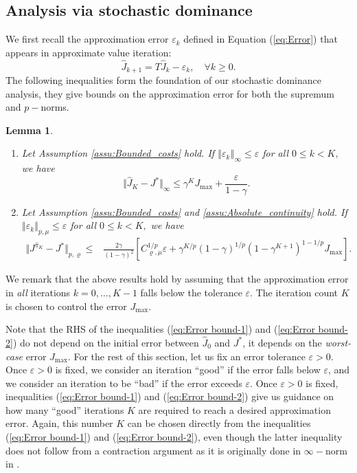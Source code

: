 \documentclass[12pt,technote,onecolumn]{IEEEtran}
\newtheorem{lemma}{Lemma}
\begin{document}
\subsection{Analysis via stochastic dominance}\label{sec6.3}

We first recall the approximation error $\varepsilon_{k}$ defined
in Equation (\ref{eq:Error}) that appears in approximate value iteration:
\[
\widehat{J}_{k+1}=T\widehat{J}_{k}-\varepsilon_{k},\quad\forall k\geq0.
\]
The following inequalities form the foundation of our stochastic dominance
analysis, they give bounds on the approximation error for both the
supremum and $p-$norms.
\begin{lemma}
	\label{lem:Stoc_approximation error} 
		\begin{enumerate}
			\item Let Assumption \ref{assu:Bounded_costs}
			hold. If $\left\Vert \varepsilon_{k}\right\Vert _{\infty}\leq\varepsilon$
			for all $0\leq k<K,$ we have
			\begin{equation}
			\Vert \widehat{J}_{K}-J^{*}\Vert _{\infty}\leq\gamma^{K}J_{\max}+\frac{\varepsilon}{1-\gamma}.\label{eq:Error bound-1}
			\end{equation}
			\item Let Assumption \ref{assu:Bounded_costs} and \ref{assu:Absolute_continuity}
			hold. If $\left\Vert \varepsilon_{k}\right\Vert _{p,\mu}\leq\varepsilon$
			for all $0\leq k<K,$ we have			
			\begin{equation}
			\begin{aligned}
			\Vert J^{\widehat{\pi}_{K}}-J^{*}\Vert _{p,\varrho}\leq&\frac{2\gamma}{\left(1-\gamma\right)^{2}}[C_{\varrho,\mu}^{1/p}\varepsilon
			+\gamma^{K/p}(1-\gamma)^{1/p}
			(1-\gamma^{K+1})^{1-1/p}J_{\max}].\label{eq:Error bound-2}
			\end{aligned}
			\end{equation}
		\end{enumerate}	
\end{lemma}

We remark that the above results hold by assuming that the approximation
error in\textbf{ }\emph{all}\textbf{ }iterations $k=0,\dots,K-1$
falls below the tolerance $\varepsilon.$ The iteration count $K$
is chosen to control the error $J_{\max}.$ 

Note that the RHS of the inequalities (\ref{eq:Error bound-1}) and
(\ref{eq:Error bound-2}) do not depend on the initial error between
$\widehat{J}_{0}$ and $J^{*}$, it depends on the \textit{worst-case}
error $J_{\max}$. For the rest of this section, let us fix an error
tolerance $\varepsilon>0$. Once $\varepsilon>0$ is fixed, we consider
an iteration ``good'' if the error falls below $\varepsilon$, and
we consider an iteration to be ``bad'' if the error exceeds $\varepsilon$.
Once $\varepsilon>0$ is fixed, inequalities (\ref{eq:Error bound-1})
and (\ref{eq:Error bound-2}) give us guidance on how many ``good''
iterations $K$ are required to reach a desired approximation error.
Again, this number $K$ can be chosen directly from the inequalities
(\ref{eq:Error bound-1}) and (\ref{eq:Error bound-2}), even though
the latter inequality does not follow from a contraction argument
as it is originally done in $\infty-$norm in \cite{Haskell_EDP_2015}.
\end{document}

